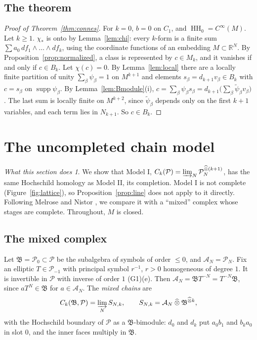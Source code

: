 \documentclass[11pt,oneside,reqno]{article}
\DeclareMathOperator{\HH}{HH}
\DeclareMathOperator{\supp}{supp}
\newcommand{\R}{\mathbb R}
\newcommand{\cA}{\mathcal A}
\newcommand{\cP}{\mathcal P}
\newcommand{\CI}{C^\infty}
\newcommand{\hot}{\mathbin{\widehat\otimes}}
\theoremstyle{plain}
\theoremstyle{definition}
\theoremstyle{remark}
\newtheorem*{whatdoes}{What this section does}
\begin{document}
\subsection{The theorem}
\begin{proof}[Proof of Theorem~\ref{thm:connes}]
For \(k=0\), \(b=0\) on \(C_1\), and \(\HH_0=\CI(M)\). Let \(k\ge1\). \(\chi_*\) is onto by Lemma~\ref{lem:chi}:
every \(k\)-form is a finite sum \(\sum a_0\,df_1\wedge\dots\wedge df_k\), using the coordinate functions of an
embedding \(M\subset\R^N\). By Proposition~\ref{prop:normalized}, a class is represented by
\(c\in M_k\), and it vanishes if and only if \(c\in B_k\). Let \(\chi(c)=0\). By Lemma~\ref{lem:local} there
are a locally finite partition of unity \(\sum_\beta\psi_\beta=1\) on \(M^{k+1}\) and elements \(s_\beta=d_{k+1}v_\beta\in B_k\)
with \(c=s_\beta\) on \(\supp\psi_\beta\). By Lemma~\ref{lem:Bmodule}(i),
\(c=\sum_\beta\psi_\beta s_\beta=d_{k+1}\bigl(\sum_\beta\tilde\psi_\beta v_\beta\bigr)\). The last sum is locally finite on
\(M^{k+2}\), since \(\tilde\psi_\beta\) depends only on the first \(k+1\) variables, and each term lies in \(N_{k+1}\).
So \(c\in B_k\).
\end{proof}

\section{The uncompleted chain model}\label{app:mixed}

\begin{whatdoes}
We show that Model I, \(C_k(\cP)=\varinjlim_N\cP_N^{\hot(k+1)}\), has the same Hochschild homology as
Model II, its completion. Model I is not complete
(Figure~\ref{fig:lattice}), so Proposition~\ref{prop:line} does not apply to it
directly. Following Melrose and Nistor \cite{MN}, we compare it with a ``mixed'' complex
whose stages are complete. Throughout, \(M\) is closed.
\end{whatdoes}

\subsection{The mixed complex}
Let \(\mathfrak B=\cP_0\subset\cP\) be the subalgebra of symbols of order \(\le0\), and \(\cA_N=\cP_N\). Fix
an elliptic \(T\in\cP_{-1}\) with principal symbol \(r^{-1}\), \(r>0\) homogeneous of degree \(1\). It is
invertible in \(\cP\) with inverse of order \(1\) (G1)(e). Then
\(\cA_N=\mathfrak BT^{-N}=T^{-N}\mathfrak B\), since \(aT^{N}\in\mathfrak B\) for \(a\in\cA_N\). The \emph{mixed
chains} are
\[
 C_k(\mathfrak B,\cP)=\varinjlim_NS_{N,k},\qquad S_{N,k}=\cA_N\hot\mathfrak B^{\hot k},
\]
with the Hochschild boundary of \(\cP\) as a \(\mathfrak B\)-bimodule: \(d_0\) and \(d_k\) put \(a_0b_1\) and
\(b_ka_0\) in slot \(0\), and the inner faces multiply in \(\mathfrak B\).
\end{document}
